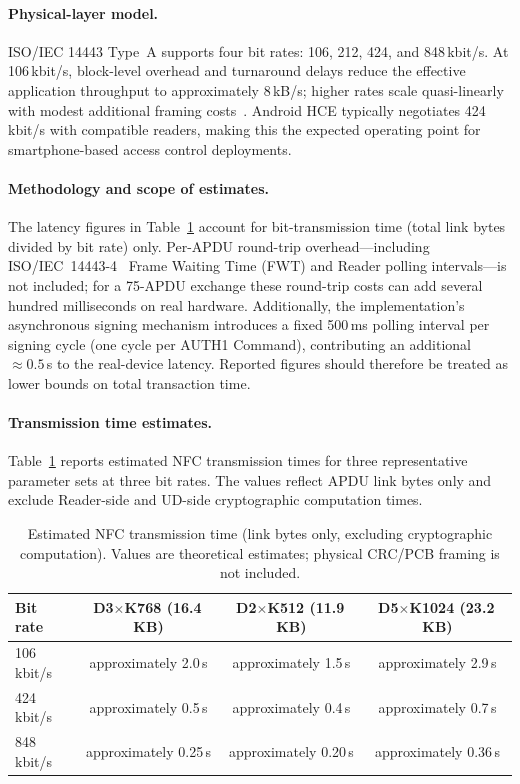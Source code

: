 \documentclass[runningheads]{llncs}
\begin{document}
\label{sec:eval:latency}

\paragraph{Physical-layer model.}
ISO/IEC 14443 Type~A supports four bit rates: 106, 212, 424, and
848\,kbit/s.  At 106\,kbit/s, block-level overhead and turnaround delays
reduce the effective application throughput to approximately 8\,kB/s;
higher rates scale quasi-linearly with modest additional framing
costs~\cite{CSA:Aliro10}.  Android HCE typically negotiates 424\,kbit/s
with compatible readers, making this the expected operating point for
smartphone-based access control deployments.

\paragraph{Methodology and scope of estimates.}
The latency figures in Table~\ref{tab:latency} account for bit-transmission time
(total link bytes divided by bit rate) only.
Per-APDU round-\allowbreak trip overhead---including ISO/IEC~14443-4~\cite{ISOIEC14443} Frame Waiting Time (FWT) and Reader polling intervals---is not included;
for a 75-APDU exchange these round-trip costs can add several hundred milliseconds
on real hardware.
Additionally, the implementation's asynchronous signing mechanism
introduces a fixed 500\,ms polling interval per signing cycle (one cycle per AUTH1
Command), contributing an additional ${\approx}0.5$\,s to the real-device latency.
Reported figures should therefore be treated as lower bounds on total transaction time.

\paragraph{Transmission time estimates.}
Table~\ref{tab:latency} reports estimated NFC transmission times for three
representative parameter sets at three bit rates.  The values reflect APDU
link bytes only and exclude Reader-side and UD-side cryptographic computation
times.

\begin{table}[t]
\centering
\caption{Estimated NFC transmission time (link bytes only, excluding
cryptographic computation).  Values are theoretical estimates; physical
CRC/PCB framing is not included.}
\label{tab:latency}
\begin{tabular}{lccc}
\hline
\textbf{Bit rate} & \textbf{D3$\times$K768 (16.4\,KB)} & \textbf{D2$\times$K512 (11.9\,KB)} & \textbf{D5$\times$K1024 (23.2\,KB)} \\
\hline
106\,kbit/s & approximately 2.0\,s & approximately 1.5\,s & approximately 2.9\,s \\
424\,kbit/s & approximately 0.5\,s & approximately 0.4\,s & approximately 0.7\,s \\
848\,kbit/s & approximately 0.25\,s & approximately 0.20\,s & approximately 0.36\,s \\
\hline
\end{tabular}
\end{table}
\end{document}

